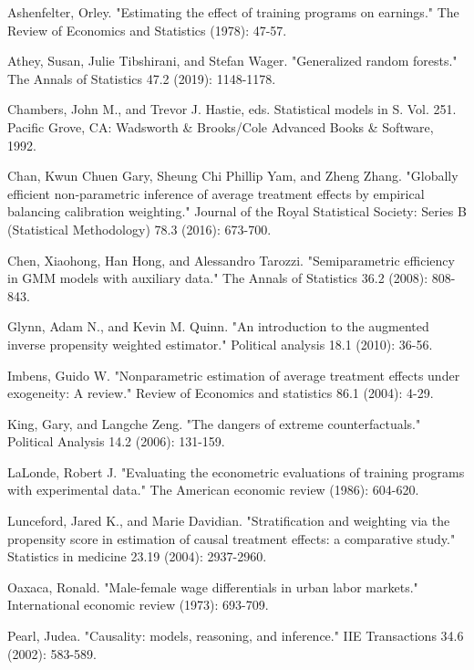 \documentclass[11pt, oneside]{article}
\begin{document}
\begin{thebibliography}{5}
Ashenfelter, Orley. "Estimating the effect of training programs on earnings." The Review of Economics and Statistics (1978): 47-57.

Athey, Susan, Julie Tibshirani, and Stefan Wager. "Generalized random forests." The Annals of Statistics 47.2 (2019): 1148-1178.

Chambers, John M., and Trevor J. Hastie, eds. Statistical models in S. Vol. 251. Pacific Grove, CA: Wadsworth \& Brooks/Cole Advanced Books \& Software, 1992.

Chan, Kwun Chuen Gary, Sheung Chi Phillip Yam, and Zheng Zhang. "Globally efficient non‐parametric inference of average treatment effects by empirical balancing calibration weighting." Journal of the Royal Statistical Society: Series B (Statistical Methodology) 78.3 (2016): 673-700.

Chen, Xiaohong, Han Hong, and Alessandro Tarozzi. "Semiparametric efficiency in GMM models with auxiliary data." The Annals of Statistics 36.2 (2008): 808-843.

Glynn, Adam N., and Kevin M. Quinn. "An introduction to the augmented inverse propensity weighted estimator." Political analysis 18.1 (2010): 36-56.

Imbens, Guido W. "Nonparametric estimation of average treatment effects under exogeneity: A review." Review of Economics and statistics 86.1 (2004): 4-29.

King, Gary, and Langche Zeng. "The dangers of extreme counterfactuals." Political Analysis 14.2 (2006): 131-159.

LaLonde, Robert J. "Evaluating the econometric evaluations of training programs with experimental data." The American economic review (1986): 604-620.

Lunceford, Jared K., and Marie Davidian. "Stratification and weighting via the propensity score in estimation of causal treatment effects: a comparative study." Statistics in medicine 23.19 (2004): 2937-2960.

Oaxaca, Ronald. "Male-female wage differentials in urban labor markets." International economic review (1973): 693-709.

Pearl, Judea. "Causality: models, reasoning, and inference." IIE Transactions 34.6 (2002): 583-589.


\end{thebibliography}
\end{document}
